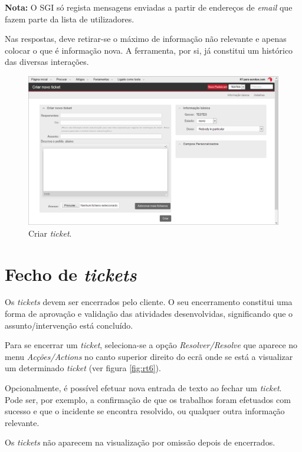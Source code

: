 \textbf{Nota:} O SGI só regista mensagens enviadas a partir de endereços de \textit{email} que fazem parte da lista de utilizadores. 

Nas respostas, deve retirar-se o máximo de informação não relevante e apenas colocar o que é informação nova. A ferramenta, por si, já constitui um histórico das diversas interações.


\begin{figure}[H]
\begin{center}
\includegraphics[width=16cm]{include/img/rt3-1-PT}
\end{center}
\caption{Criar \textit{ticket}.}
\label{fig:rt3}
\end{figure}

\section{Fecho de \emph{tickets}}
Os \textit{tickets} devem ser encerrados pelo cliente. O seu encerramento constitui uma forma de aprovação e validação das atividades desenvolvidas, significando que o assunto/intervenção está concluído.

Para se encerrar um \emph{ticket}, seleciona-se a opção \emph{Resolver/\textit{Resolve}} que aparece no menu \emph{Acções/\textit{Actions}} no canto superior direito do ecrã onde se está a visualizar um determinado \emph{ticket} (ver figura \ref{fig:rt6}).

Opcionalmente, é possível efetuar nova entrada de texto ao fechar um \textit{ticket}. Pode ser, por exemplo, a confirmação de que os trabalhos foram efetuados com sucesso e que o incidente se encontra resolvido, ou qualquer outra informação relevante.

Os \textit{tickets} não aparecem na visualização por omissão depois de encerrados.

